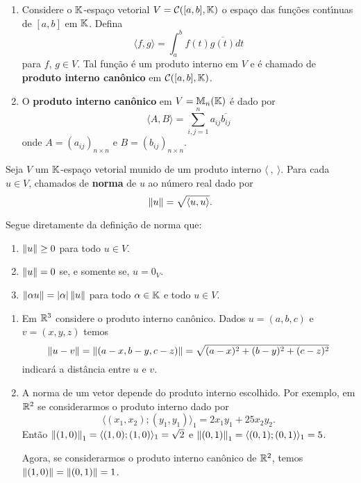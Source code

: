\begin{exemplo}
\begin{enumerate}
\[		\]
		\'e um produto interno em $\cp{K}^n$. Tal produto interno \'e chamada de \textbf{produto interno can\^onico} em $\cp{K}^n$.
		\item Considere o $\mathbb{K}$-espa\c{c}o vetorial $V = \mathcal{C}([a, b], \mathbb{K})$ o espa\c{c}o das fun\c{c}\~oes cont{\'\i}nuas de $[a,b]$ em $\mathbb{K}$. Defina
   		 \[
        	\langle f , g \rangle = \int_a^bf(t)\overline{g(t)}dt
    	\]
    	para $f$, $g \in V$. Tal fun\c{c}\~ao \'e um produto interno em $V$ e \'e chamado de \textbf{produto interno can\^onico} em $\mathcal{C}([a, b], \mathbb{K})$.
    	\item O \textbf{produto interno can\^onico} em $V = \mathbb{M}_n(\mathbb{K})$ \'e dado por
    	\[
    		\langle A, B \rangle = \sum_{i, j = 1}^n a_{ij}\overline{b_{ij}}
    	\]
    	onde $A = (a_{ij})_{n \times n}$ e $B = (b_{ij})_{n \times n}$.
	\end{enumerate}
\end{exemplo}

\begin{definicao}
	Seja $V$ um $\mathbb{K}$-espa\c{c}o vetorial munido de um produto interno $\langle\ ,\ \rangle$. Para cada $u \in V$, chamados de \textbf{norma} de $u$ ao n\'umero real dado por
	\[
		\left\lVert u\right\rVert = \sqrt{\langle u, u \rangle}.
	\]
\end{definicao}

\begin{observacao}
	Segue diretamente da defini\c{c}\~ao de norma que:
	\begin{enumerate}
		\item $\left\lVert u\right\rVert \ge 0$ para todo $u \in V$.
		\item $\left\lVert u\right\rVert = 0$ se, e somente se, $u = 0_V$.
		\item $\left\lVert\alpha u\right\rVert = |\alpha|\left\lVert u\right\rVert$ para todo $\alpha \in \mathbb{K}$ e todo $u \in V$.
	\end{enumerate}
\end{observacao}

\begin{exemplo}
	\begin{enumerate}
		\item Em $\mathbb{R}^3$ considere o produto interno can\^onico. Dados $u = (a, b, c)$ e $v = (x, y, z)$ temos
		\[
			\left\lVert u - v\right\rVert = \left\lVert(a - x, b - y, c - z)\right\rVert = \sqrt{(a - x)^2 + (b - y)^2 + (c - z)^2}
		\]
		indicar\'a a dist\^ancia entre $u$ e $v$.
		\item A norma de um vetor depende do produto interno escolhido. Por exemplo, em $\mathbb{R}^2$ se considerarmos o produto interno dado por
		\[
			\langle (x_1, x_2); (y_1, y_1)\rangle_1 = 2x_1y_1 + 25x_2y_2.
		\]
		Ent\~ao $\left\lVert(1, 0)\right\rVert_1 = \langle (1, 0); (1, 0)\rangle_1 = \sqrt{2}$ e $\left\lVert(0, 1)\right\rVert_1 = \langle (0, 1); (0, 1)\rangle_1 = 5$.

		Agora, se considerarmos o produto interno can\^onico de $\mathbb{R}^2$, temos $\left\lVert(1, 0)\right\rVert = \left\lVert(0, 1)\right\rVert = 1$.
	\end{enumerate}
\end{exemplo}

